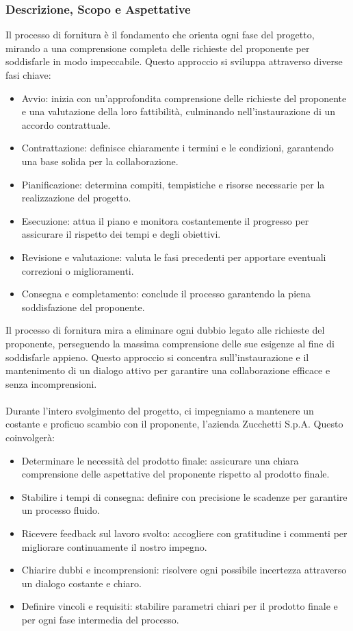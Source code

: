 \documentclass{article}
\begin{document}
\subsubsection{Descrizione, Scopo e Aspettative }
Il processo di fornitura è il fondamento che orienta ogni fase del progetto, mirando a una comprensione completa delle richieste del proponente per soddisfarle in modo impeccabile. Questo approccio si sviluppa attraverso diverse fasi chiave:
\begin{itemize}
    \item{Avvio:} inizia con un'approfondita comprensione delle richieste del proponente e una valutazione della loro fattibilità, culminando nell'instaurazione di un accordo contrattuale.
    \item{Contrattazione:} definisce chiaramente i termini e le condizioni, garantendo una base solida per la collaborazione.
    \item{Pianificazione:} determina compiti, tempistiche e risorse necessarie per la realizzazione del progetto.
    \item{Esecuzione:} attua il piano e monitora costantemente il progresso per assicurare il rispetto dei tempi e degli obiettivi.
    \item{Revisione e valutazione:} valuta le fasi precedenti per apportare eventuali correzioni o miglioramenti. 
    \item{Consegna e completamento:} conclude il processo garantendo la piena soddisfazione del proponente.
\end{itemize}
Il processo di fornitura mira a eliminare ogni dubbio legato alle richieste del proponente, perseguendo la massima comprensione delle sue esigenze al fine di soddisfarle appieno. Questo approccio si concentra sull'instaurazione e il mantenimento di un dialogo attivo per garantire una collaborazione efficace e senza incomprensioni.\\\\
Durante l'intero svolgimento del progetto, ci impegniamo a mantenere un costante e proficuo scambio con il proponente, l'azienda Zucchetti S.p.A. Questo coinvolgerà:
\begin{itemize}
    \item Determinare le necessità del prodotto finale: assicurare una chiara comprensione delle aspettative del proponente rispetto al prodotto finale.
    \item Stabilire i tempi di consegna: definire con precisione le scadenze per garantire un processo fluido.
    \item Ricevere feedback sul lavoro svolto: accogliere con gratitudine i commenti per migliorare continuamente il nostro impegno.
    \item Chiarire dubbi e incomprensioni: risolvere ogni possibile incertezza attraverso un dialogo costante e chiaro.
    \item Definire vincoli e requisiti: stabilire parametri chiari per il prodotto finale e per ogni fase intermedia del processo.
\end{itemize}
\end{document}
